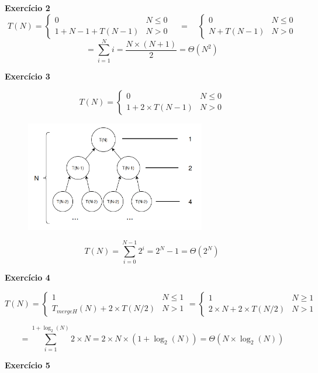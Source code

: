 \documentclass[a4paper,11pt]{article}
\begin{document}
	\noindent \textbf{Exercício 2}
	\[
		T(N) =
		\begin{cases}
			0 & N \leq 0 \\
			1 + N - 1 + T(N - 1) & N > 0
		\end{cases}
		\quad = \quad
		\begin{cases}
			0 & N \leq 0 \\
			N + T(N - 1) & N > 0
		\end{cases}
	\]
	\[
		= \sum_{i=1}^{N} i = \frac{N \times (N + 1)}{2} = \Theta(N^2)
	\]
	
	
	\noindent \textbf{Exercício 3}
	
	\[
		T(N) = 
		\begin{cases}
			0 & N \leq 0 \\
			1 + 2 \times T(N - 1) & N > 0
		\end{cases}
	\]
	
	\begin{figure}[h]
		\centering
		\includegraphics[width=0.7\textwidth]{imgs/2_3}
		\label{fig:2_3}
	\end{figure}
	
	\[
		T(N) = \sum_{i=0}^{N-1} 2^i = 2^N - 1 = \Theta(2^N)
	\]
	
	\noindent \textbf{Exercício 4}
	
	\[
		T(N) = 
		\begin{cases}
			1 & N \leq 1 \\
			T_{mergeH}(N) + 2 \times T(N / 2) & N > 1
		\end{cases}
		=
		\begin{cases}
			1 & N \geq 1 \\
			2 \times N + 2 \times T(N/2) & N > 1
		\end{cases}
	\]
	
	\[
		= \sum_{i=1}^{1 + \log_2(N)} 2 \times N = 2 \times N \times (1 + \log_2(N)) = \Theta(N \times \log_2(N))
	\]
	
	\noindent \textbf{Exercício 5}\\
	
\end{document}
